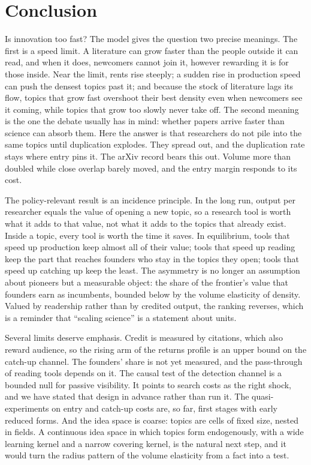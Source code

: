 \section{Conclusion}\label{sec:conclusion}

Is innovation too fast? The model gives the question two precise meanings. The
first is a speed limit. A literature can grow faster than the people outside it
can read, and when it does, newcomers cannot join it, however rewarding it is
for those inside. Near the limit, rents rise steeply; a sudden rise in
production speed can push the densest topics past it; and because the stock of
literature lags its flow, topics that grow fast overshoot their best density
even when newcomers see it coming, while topics that grow too slowly never take
off. The second meaning is the one the debate usually has in mind: whether
papers arrive faster than science can absorb them. Here the answer is that
researchers do not pile into the same topics until duplication explodes. They
spread out, and the duplication rate stays where entry pins it. The arXiv record
bears this out. Volume more than doubled while close overlap barely moved, and
the entry margin responds to its cost.

The policy-relevant result is an incidence principle. In the long run, output
per researcher equals the value of opening a new topic, so a research tool is
worth what it adds to that value, not what it adds to the topics that already
exist. Inside a topic, every tool is worth the time it saves. In equilibrium,
tools that speed up production keep almost all of their value; tools that speed
up reading keep the part that reaches founders who stay in the topics they open;
tools that speed up catching up keep the least. The asymmetry is no longer an
assumption about pioneers but a measurable object: the share of the frontier's
value that founders earn as incumbents, bounded below by the volume elasticity
of density. Valued by readership rather than by credited output, the ranking
reverses, which is a reminder that ``scaling science'' is a statement about
units.

Several limits deserve emphasis. Credit is measured by citations, which also
reward audience, so the rising arm of the returns profile is an upper bound on
the catch-up channel. The founders' share is not yet measured, and the
pass-through of reading tools depends on it. The causal test of the detection
channel is a bounded null for passive visibility. It points to search costs as
the right shock, and we have stated that design in advance rather than run it.
The quasi-experiments on entry and catch-up costs are, so far, first stages with
early reduced forms. And the idea space is coarse: topics are cells of fixed
size, nested in fields. A continuous idea space in which topics form
endogenously, with a wide learning kernel and a narrow covering kernel, is the
natural next step, and it would turn the radius pattern of the volume
elasticity from a fact into a test.
